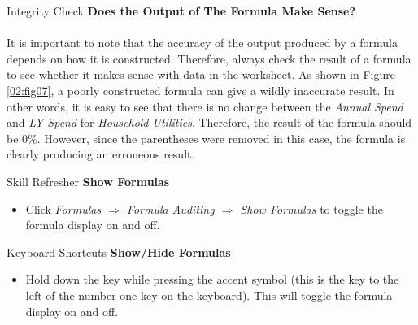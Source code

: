 \begin{center}
	\begin{infobox}{Integrity Check}
		\textbf{Does the Output of The Formula Make Sense?}
		\\
		\\
		It is important to note that the accuracy of the output produced by a formula depends on how it is constructed. Therefore, always check the result of a formula to see whether it makes sense with data in the worksheet. As shown in Figure \ref{02:fig07}, a poorly constructed formula can give a wildly inaccurate result. In other words, it is easy to see that there is no change between the \textit{Annual Spend} and \textit{LY Spend} for \textit{Household Utilities}. Therefore, the result of the formula should be $ 0 $\%. However, since the parentheses were removed in this case, the formula is clearly producing an erroneous result.
	\end{infobox}
\end{center}

\begin{center}
	\begin{sklbox}{Skill Refresher}
		\textbf{Show Formulas}
		\\
		\begin{itemize}
			\setlength{\itemsep}{0pt}
			\setlength{\parskip}{0pt}
			\setlength{\parsep}{0pt}
			
			\item Click \textit{Formulas $ \Rightarrow $ Formula Auditing $ \Rightarrow $ Show Formulas} to toggle the formula display on and off.
			
		\end{itemize}
	\end{sklbox}
\end{center}

\begin{center}
	\begin{shtcutbox}{Keyboard Shortcuts}
		\textbf{Show/Hide Formulas}
		\\
		\begin{itemize}
			\setlength{\itemsep}{0pt}
			\setlength{\parskip}{0pt}
			\setlength{\parsep}{0pt}
			
			\item Hold down the  key while pressing the accent symbol  (this is the key to the left of the number one key on the keyboard). This will toggle the formula display on and off.
			
		\end{itemize}
	\end{shtcutbox}
\end{center}

